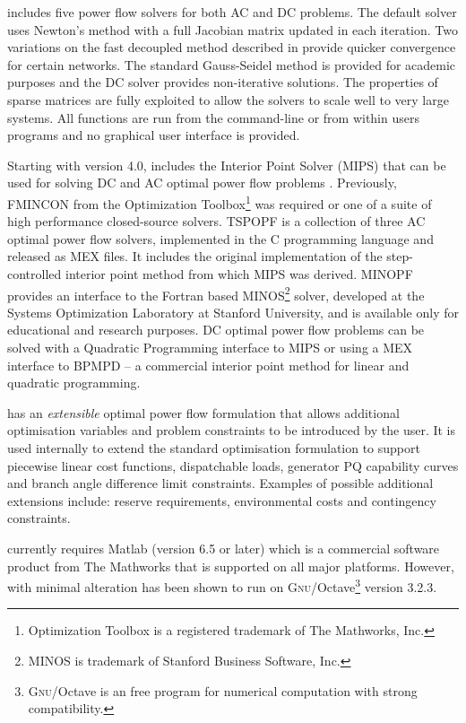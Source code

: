 \matpower includes five power flow solvers for both AC and DC problems.  The
default solver uses Newton's method \cite{tinney:67} with a full Jacobian matrix
updated in each iteration.  Two variations on the fast decoupled method
\cite{stott:74} described in  provide quicker convergence
for certain networks.  The standard Gauss-Seidel method \cite{glimn:57} is provided
for academic purposes and the DC solver provides non-iterative
solutions.  The properties of \matlab sparse matrices are fully exploited to
allow the solvers to scale well to very large systems.  All functions are run
from the \matlab command-line or from within users programs and no graphical
user interface is provided.

Starting with version 4.0, \matpower includes the
\matlab Interior Point Solver (MIPS) that can be used for solving
DC and AC optimal power flow problems \cite{zimmerman:ccv}.  Previously,
FMINCON from the \matlab Optimization Toolbox\footnote{Optimization
Toolbox is a registered trademark of The Mathworks, Inc.} was required or one
of a suite of high performance closed-source solvers.  TSPOPF is a
collection of three AC optimal power flow solvers, implemented in the C
programming language and released as \matlab MEX files.  It includes
the original implementation of the step-controlled interior point method from
which MIPS was derived.  MINOPF provides an interface to the
Fortran based MINOS\footnote{MINOS is trademark of Stanford
Business Software, Inc.} solver, developed at the Systems Optimization
Laboratory at Stanford University, and is available only for educational and
research purposes. DC optimal power flow problems can be solved with
a Quadratic Programming interface to MIPS or using a MEX interface to BPMPD --
a commercial interior point method for linear and quadratic programming.

\matpower has an \textit{extensible} optimal power flow formulation that allows
additional optimisation variables and problem constraints to be introduced by
the user.  It is used internally to extend the standard optimisation
formulation to support piecewise linear cost functions, dispatchable loads,
generator PQ capability curves and branch angle difference limit constraints.
Examples of possible additional extensions include: reserve requirements,
environmental costs and contingency constraints.

\matpower currently requires Matlab (version 6.5 or later) which is a
commercial software product from The Mathworks that is supported on all
major platforms.  However, with minimal alteration \matpower has been shown to
run on \textsc{Gnu}/Octave\footnote{\textsc{Gnu}/Octave is an free program for
numerical computation with strong \matlab compatibility.} version 3.2.3.

